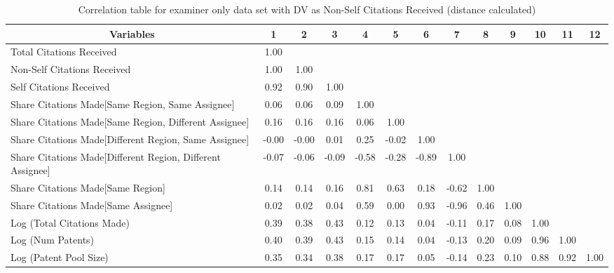 \begin{table}[htbp]\centering \caption{Correlation table for examiner only data set with DV as Non-Self Citations Received (distance calculated)\label{e.ncorrelation}}
\scriptsize
\singlespacing
\begin{adjustbox}{angle=90}
\begin{tabular}{l  c  c  c  c  c  c  c  c  c  c  c  c }\hline\hline
\multicolumn{1}{c}{Variables} &1&2&3&4&5&6&7&8&9&10&11&12\\ \hline
Total Citations Received&1.00\\
Non-Self Citations Received&1.00&1.00\\
Self Citations Received&0.92&0.90&1.00\\
Share Citations Made[Same Region, Same Assignee]&0.06&0.06&0.09&1.00\\
Share Citations Made[Same Region, Different Assignee]&0.16&0.16&0.16&0.06&1.00\\
Share Citations Made[Different Region, Same Assignee]&-0.00&-0.00&0.01&0.25&-0.02&1.00\\
Share Citations Made[Different Region, Different Assignee]&-0.07&-0.06&-0.09&-0.58&-0.28&-0.89&1.00\\
Share Citations Made[Same Region]&0.14&0.14&0.16&0.81&0.63&0.18&-0.62&1.00\\
Share Citations Made[Same Assignee]&0.02&0.02&0.04&0.59&0.00&0.93&-0.96&0.46&1.00\\
Log (Total Citations Made)&0.39&0.38&0.43&0.12&0.13&0.04&-0.11&0.17&0.08&1.00\\
Log (Num Patents)&0.40&0.39&0.43&0.15&0.14&0.04&-0.13&0.20&0.09&0.96&1.00\\
Log (Patent Pool Size)&0.35&0.34&0.38&0.17&0.17&0.05&-0.14&0.23&0.10&0.88&0.92&1.00\\
\hline \hline 
 \end{tabular}
 \end{adjustbox}
\end{table}
